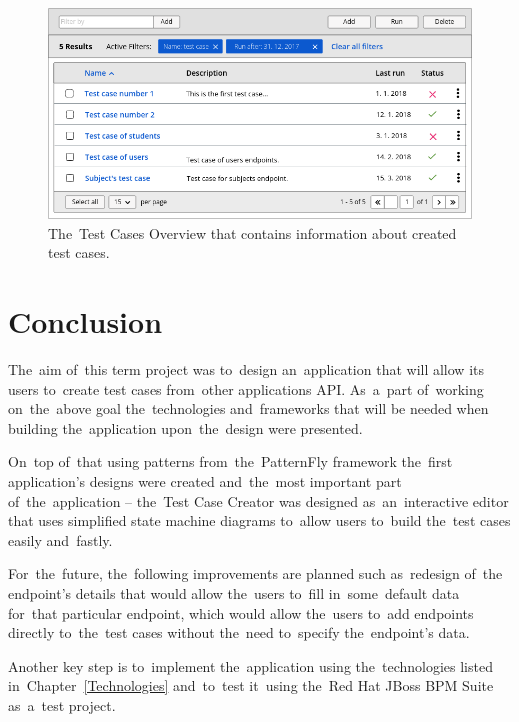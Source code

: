\begin{figure}[!hbt]
	\centering
	\includegraphics[scale=0.4]{./designs/drafts-1.0/test-cases.png}
	\caption{The~Test Cases Overview that contains information about created test
	cases.}
	\label{test-cases}
\end{figure}




\chapter{Conclusion}
The~aim of~this term project was to~design an~application that will allow its
users to~create test cases from~other applications API. As~a~part of~working
on~the~above goal the~technologies and~frameworks that will be needed when
building the~application upon~the~design were presented.

On~top of~that using patterns from~the~PatternFly framework the~first
application's designs were created and~the~most important part
of~the~application -- the~Test Case Creator was designed as~an~interactive
editor that uses simplified state machine diagrams to~allow users to~build the~test
cases easily and~fastly.

For~the~future, the~following improvements are planned such as~redesign of~the
endpoint's details that would allow the~users to~fill in~some~default data
for~that particular endpoint, which would allow the~users to~add endpoints
directly to~the~test cases without the~need to~specify the~endpoint's data.

Another key step is to~implement the~application using the~technologies listed
in~Chapter~\ref{Technologies} and~to~test it~using the~Red Hat JBoss BPM Suite
as~a~test project.



